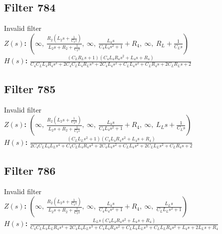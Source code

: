 \documentclass{article}
\begin{document}
\subsection*{Filter 784}
Invalid filter \\ 
\textbf{$Z(s)$:} $\left( \infty, \  \frac{R_{2} \left(L_{2} s + \frac{1}{C_{2} s}\right)}{L_{2} s + R_{2} + \frac{1}{C_{2} s}}, \  \infty, \  \frac{L_{4} s}{C_{4} L_{4} s^{2} + 1} + R_{4}, \  \infty, \  R_{L} + \frac{1}{C_{L} s}\right)$ \\ 
\textbf{$H(s)$:} $\frac{\left(C_{L} R_{L} s + 1\right) \left(C_{4} L_{4} R_{4} s^{2} + L_{4} s + R_{4}\right)}{C_{4} C_{L} L_{4} R_{4} s^{3} + 2 C_{4} C_{L} L_{4} R_{L} s^{3} + 2 C_{4} L_{4} s^{2} + C_{L} L_{4} s^{2} + C_{L} R_{4} s + 2 C_{L} R_{L} s + 2}$ \\ 
\subsection*{Filter 785}
Invalid filter \\ 
\textbf{$Z(s)$:} $\left( \infty, \  \frac{R_{2} \left(L_{2} s + \frac{1}{C_{2} s}\right)}{L_{2} s + R_{2} + \frac{1}{C_{2} s}}, \  \infty, \  \frac{L_{4} s}{C_{4} L_{4} s^{2} + 1} + R_{4}, \  \infty, \  L_{L} s + \frac{1}{C_{L} s}\right)$ \\ 
\textbf{$H(s)$:} $\frac{\left(C_{L} L_{L} s^{2} + 1\right) \left(C_{4} L_{4} R_{4} s^{2} + L_{4} s + R_{4}\right)}{2 C_{4} C_{L} L_{4} L_{L} s^{4} + C_{4} C_{L} L_{4} R_{4} s^{3} + 2 C_{4} L_{4} s^{2} + C_{L} L_{4} s^{2} + 2 C_{L} L_{L} s^{2} + C_{L} R_{4} s + 2}$ \\ 
\subsection*{Filter 786}
Invalid filter \\ 
\textbf{$Z(s)$:} $\left( \infty, \  \frac{R_{2} \left(L_{2} s + \frac{1}{C_{2} s}\right)}{L_{2} s + R_{2} + \frac{1}{C_{2} s}}, \  \infty, \  \frac{L_{4} s}{C_{4} L_{4} s^{2} + 1} + R_{4}, \  \infty, \  \frac{L_{L} s}{C_{L} L_{L} s^{2} + 1}\right)$ \\ 
\textbf{$H(s)$:} $\frac{L_{L} s \left(C_{4} L_{4} R_{4} s^{2} + L_{4} s + R_{4}\right)}{C_{4} C_{L} L_{4} L_{L} R_{4} s^{4} + 2 C_{4} L_{4} L_{L} s^{3} + C_{4} L_{4} R_{4} s^{2} + C_{L} L_{4} L_{L} s^{3} + C_{L} L_{L} R_{4} s^{2} + L_{4} s + 2 L_{L} s + R_{4}}$ \\ 
\end{document}
